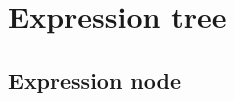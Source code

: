 \section{Expression tree}
\label{sec:exprtree}





% 

\subsection{Expression node}
\label{subsec:exprnode}




